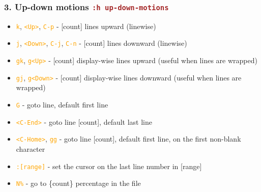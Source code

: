 \documentclass{beamer}
\newcommand{\vimcommand}[1]{\texttt{\textcolor{brown}{#1}}}
\newcommand{\vimmotion}[1]{\texttt{\textcolor{orange}{#1}}}
\newcommand{\vimhelp}[1]{\vimcommand{:h #1}}
\begin{document}
\begin{frame}
    \frametitle{3. Up-down motions \vimhelp{up-down-motions}}
    \begin{itemize}
        \item \vimmotion{k}, \vimmotion{\textless{}Up\textgreater{}}, \vimmotion{C-p} - [count] lines upward (linewise)
        \item \vimmotion{j}, \vimmotion{\textless{}Down\textgreater{}}, \vimmotion{C-j}, \vimmotion{C-n} - [count] lines downward (linewise)
        \item \vimmotion{gk}, \vimmotion{g\textless{}Up\textgreater{}} - [count] display-wise lines upward (useful when lines are wrapped)
        \item \vimmotion{gj}, \vimmotion{g\textless{}Down\textgreater{}} - [count] display-wise lines downward (useful when lines are wrapped)
        \item \vimmotion{G} - goto line, default first line
        \item \vimmotion{\textless{}C-End\textgreater{}} - goto line [count], default last line
        \item \vimmotion{\textless{}C-Home\textgreater{}}, \vimmotion{gg} - goto line [count], default first line, on the first non-blank character
        \item \vimmotion{:[range]} - set the cursor on the last line number in [range]
        \item \vimmotion{N\%} - go to \{count\} percentage in the file
    \end{itemize}
\end{frame}
\end{document}
